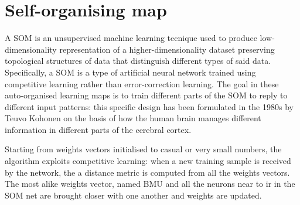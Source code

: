 \newpage
\section{Self-organising map}
A \ac{SOM} is an unsupervised machine learning tecnique used to produce low-dimensionality representation of a higher-dimensionality dataset preserving topological structures of data that distinguish different types of said data. Specifically, a \ac{SOM} is a type of artificial neural network trained using competitive learning rather than error-correction learning. The goal in these auto-organised learning maps is to train different parts of the \ac{SOM} to reply to different input patterns: this specific design has been formulated in the 1980s by Teuvo Kohonen on the basis of how the human brain manages different information in different parts of the cerebral cortex.

Starting from weights vectors initialised to casual or very small numbers, the algorithm exploits competitive learning: when a new training sample is received by the network, the a distance metric is computed from all the weights vectors. The most alike weights vector, named \ac{BMU} and all the neurons near to ir in the \ac{SOM} net are brought closer with one another and weights are updated.
